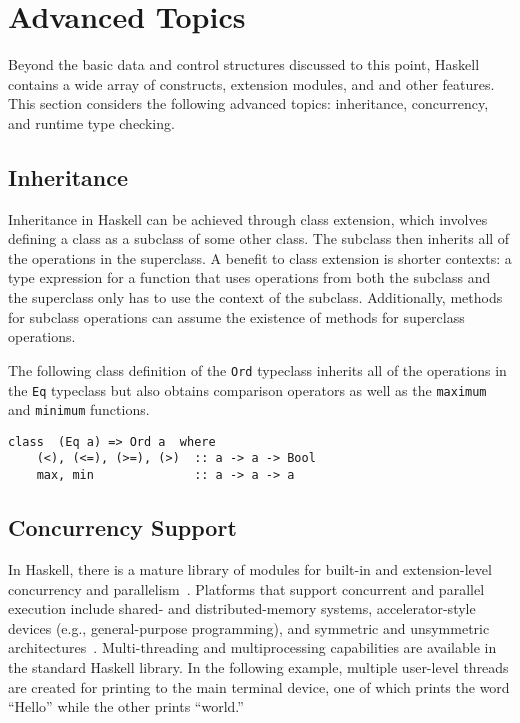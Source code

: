 \documentclass[titlepage,12pt]{article}
\begin{document}
\section{Advanced Topics}
Beyond the basic data and control structures discussed to this point,
Haskell contains a wide array of constructs, extension modules, and
and other features.  This section considers the following advanced
topics: inheritance, concurrency, and runtime type checking.

\subsection{Inheritance}

Inheritance in Haskell can be achieved through class extension, which involves defining a class as a subclass 
of some other class. The subclass then inherits all of the operations in the superclass. A benefit to class 
extension is shorter contexts: a type expression for a function that uses operations from both the subclass 
and the superclass only has to use the context of the subclass. Additionally, methods for subclass 
operations can assume the existence of methods for superclass operations.

The following class definition of the \texttt{Ord} typeclass inherits all of the operations in the \texttt{Eq} typeclass but
also obtains comparison operators as well as the \texttt{maximum} and \texttt{minimum} functions.

\begin{verbatim}
class  (Eq a) => Ord a  where
    (<), (<=), (>=), (>)  :: a -> a -> Bool
    max, min              :: a -> a -> a
\end{verbatim}

\subsection{Concurrency Support}

In Haskell, there is a mature library of modules for built-in and extension-level
concurrency and parallelism~\cite{haskell-concurr}.  Platforms that support concurrent and parallel execution include shared- and
distributed-memory systems, accelerator-style devices (e.g., general-purpose programming), and
symmetric and unsymmetric architectures~\cite{par-funk}.  Multi-threading and multiprocessing capabilities are available in
the standard Haskell library.  In the following example, multiple user-level threads are created for printing
to the main terminal device, one of which prints the word ``Hello'' while the other prints ``world.''
\end{document}
